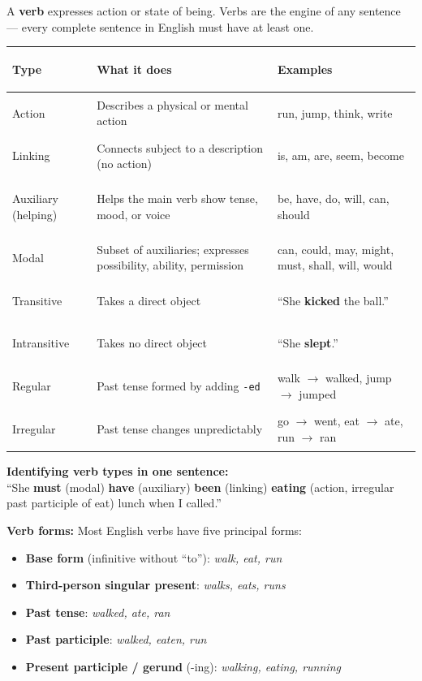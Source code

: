 \documentclass[11pt, letterpaper]{article}
\newcommand{\example}[1]{%
  \begin{tcolorbox}[colback=exbg, colframe=exborder,
    title={\bfseries Example}, arc=3pt, boxrule=1pt]
  #1
  \end{tcolorbox}%
}
\begin{document}
A \textbf{verb} expresses action or state of being. Verbs are the engine of any sentence ---
every complete sentence in English must have at least one.

\noindent
{\renewcommand{\arraystretch}{1.5}
\begin{tabularx}{\textwidth}{>{\bfseries\raggedright\arraybackslash}p{3cm}
                              >{\raggedright\arraybackslash}X
                              >{\raggedright\arraybackslash}p{3.5cm}}
\toprule
\rowcolor{tableheader}
\textbf{Type} & \textbf{What it does} & \textbf{Examples} \\
\midrule
\rowcolor{rowA}  Action      & Describes a physical or mental action       & run, jump, think, write \\
\rowcolor{rowB}  Linking     & Connects subject to a description (no action) & is, am, are, seem, become \\
\rowcolor{rowA}  Auxiliary (helping) & Helps the main verb show tense, mood, or voice & be, have, do, will, can, should \\
\rowcolor{rowB}  Modal       & Subset of auxiliaries; expresses possibility, ability, permission & can, could, may, might, must, shall, will, would \\
\rowcolor{rowA}  Transitive  & Takes a direct object                       & ``She \textbf{kicked} the ball.'' \\
\rowcolor{rowB}  Intransitive& Takes no direct object                      & ``She \textbf{slept}.'' \\
\rowcolor{rowA}  Regular     & Past tense formed by adding \texttt{-ed}    & walk $\to$ walked, jump $\to$ jumped \\
\rowcolor{rowB}  Irregular   & Past tense changes unpredictably            & go $\to$ went, eat $\to$ ate, run $\to$ ran \\
\bottomrule
\end{tabularx}}

\example{
\textbf{Identifying verb types in one sentence:}\\
``She \textbf{must} (modal) \textbf{have} (auxiliary) \textbf{been} (linking)
\textbf{eating} (action, irregular past participle of eat) lunch when I called.''
}

\textbf{Verb forms:} Most English verbs have five principal forms:
\begin{itemize}[noitemsep]
  \item \textbf{Base form} (infinitive without ``to''): \emph{walk, eat, run}
  \item \textbf{Third-person singular present}: \emph{walks, eats, runs}
  \item \textbf{Past tense}: \emph{walked, ate, ran}
  \item \textbf{Past participle}: \emph{walked, eaten, run}
  \item \textbf{Present participle / gerund} (-ing): \emph{walking, eating, running}
\end{itemize}
\end{document}
